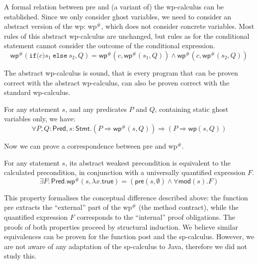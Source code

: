 A formal relation between \textsf{pre} and (a variant of) the
\textsf{wp}-calculus can be established. Since we only consider ghost
variables, we need to consider an abstract version of the \textsf{wp}:
\textsf{wp}\(^{\#}\), which does not consider concrete
variables. Most rules of this abstract \textsf{wp}-calculus are
unchanged, but rules as for the conditional statement cannot consider
the outcome of the conditional expression.
\[
\mathsf{wp}^{\#}(\mathtt{if (}c\mathtt{)}s_1\mathtt{\:else\:}s_2,Q) =
\mathsf{wp}^{\#}(c, \mathsf{wp}^{\#}(s_1, Q)) \wedge
\mathsf{wp}^{\#}(c, \mathsf{wp}^{\#}(s_2, Q))
\]

The abstract \textsf{wp}-calculus is sound, that is every program that
can be proven correct with the abstract \textsf{wp}-calculus, can also
be proven correct with the standard \textsf{wp}-calculus.

\begin{lemma} For any statement \(s\), and any predicates \(P\) and
\(Q\), containing static ghost variables only, we have:
\[
\forall P, Q\colon\mathsf{Pred}, s\colon\mathsf{Stmt}. 
(P \Rightarrow \mathsf{wp}^{\#}(s, Q)) \Rightarrow (P \Rightarrow
\mathsf{wp}(s, Q))
\]
\end{lemma}


Now we  can prove a correspondence between \textsf{pre} and
\textsf{wp}\(^{\#}\). 


\begin{theorem}[Correspondence]
For any statement \(s\), its abstract weakest precondition is
equivalent to the calculated precondition, in conjunction with a
universally quantified expression \(F\).
\[
\exists F\colon\mathsf{Pred}.  
             \mathsf{wp}^{\#}(s, \lambda x. \mathsf{true}) = 
             (\mathsf{pre}(s, \emptyset) \wedge \forall
              \mathsf{mod}(s). F) 
\]
\end{theorem}

This property formalises the conceptual difference described above:
the function \textsf{pre} extracts the ``external'' part of the
\textsf{wp}\(^{\#}\) (the method contract), while the quantified
expression \(F\) corresponds to the ``internal'' proof obligations.
The proofs of both properties proceed by structural induction.
We believe similar equivalences can be proven for the function
\textsf{post} and the \textsf{sp}-calculus. However, we
are not aware of any adaptation of the \textsf{sp}-calculus to Java,
therefore we did not study this.



